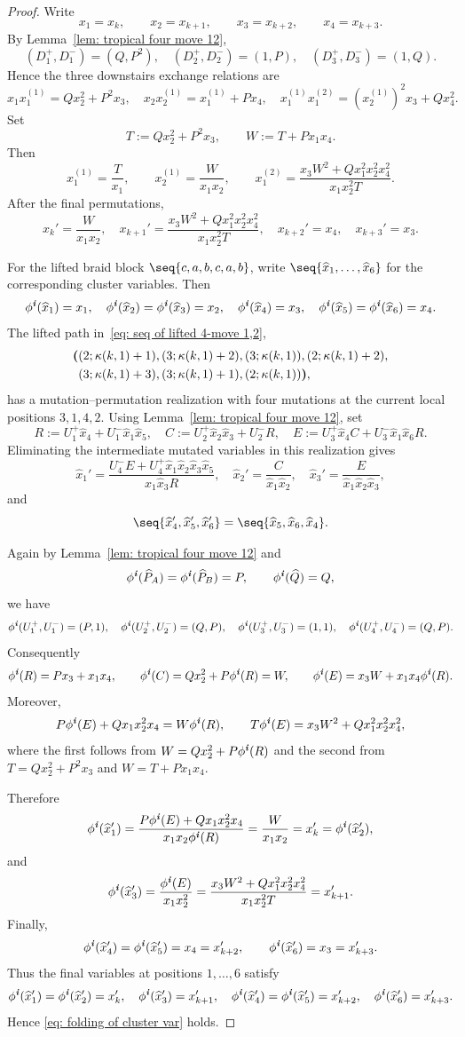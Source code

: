 \documentclass[12pt, leqno]{amsart}
\numberwithin{equation}{section}
\theoremstyle{plain}
\theoremstyle{definition}
\newcommand{\seteq}{\mathbin{:=}}
\newcommand{\ii}{ \textbf{\textit{i}}}
\newcommand{\hP}{\widehat{P}}
\newcommand{\hQ}{\widehat{Q}}
\newcommand{\hx}{\widehat{x}}
\begin{document}
\begin{proof}
Write
\[
x_1=x_k,\qquad x_2=x_{k+1},\qquad
x_3=x_{k+2},\qquad x_4=x_{k+3}.
\]
By Lemma~\ref{lem: tropical four move 12},
\[
(D_1^+,D_1^-)=(Q,P^2),\quad
(D_2^+,D_2^-)=(1,P),\quad
(D_3^+,D_3^-)=(1,Q).
\]
Hence the three downstairs exchange relations are
\[
x_1x_1^{(1)}=Qx_2^2+P^2x_3,\quad
x_2x_2^{(1)}=x_1^{(1)}+Px_4,\quad
x_1^{(1)}x_1^{(2)}=(x_2^{(1)})^2x_3+Qx_4^2.
\]
Set
\[
T \seteq Qx_2^2+P^2x_3,\qquad
W \seteq T+Px_1x_4.
\]
Then
\[
x_1^{(1)}=\frac{T}{x_1},\qquad
x_2^{(1)}=\frac{W}{x_1x_2},\qquad
x_1^{(2)}
=\frac{x_3W^2+Qx_1^2x_2^2x_4^2}{x_1x_2^2T}.
\]
After the final permutations,
\[
x_k'=\frac{W}{x_1x_2},\quad
x_{k+1}'=\frac{x_3W^2+Qx_1^2x_2^2x_4^2}{x_1x_2^2T},
\quad x_{k+2}'=x_4,\quad x_{k+3}'=x_3.
\]

  For the lifted braid block $\seq{c,a,b,c,a,b}$, write 
$\seq{\hx_1,\ldots,\hx_6}$ for the corresponding cluster variables.
Then
\[
\phi^\ii(\hx_1)=x_1,\quad
\phi^\ii(\hx_2)=\phi^\ii(\hx_3)=x_2,\quad
\phi^\ii(\hx_4)=x_3,\quad
\phi^\ii(\hx_5)=\phi^\ii(\hx_6)=x_4.
\]
The lifted path in~\eqref{eq: seq of lifted 4-move 1,2},
\begin{align*}
\boldsymbol{(}&(2;\kappa(k,1)+1),(3;\kappa(k,1)+2),
(3;\kappa(k,1)),(2;\kappa(k,1)+2), \allowdisplaybreaks \\
&(3;\kappa(k,1)+3),(3;\kappa(k,1)+1),
(2;\kappa(k,1))\boldsymbol{)},
\end{align*}
 has a mutation--permutation realization with four mutations at the current local positions $3,1,4,2$.
Using Lemma~\ref{lem: tropical four move 12}, set
\[
R \seteq U_1^+\hx_4+U_1^-\hx_1\hx_5,\quad
C \seteq U_2^+\hx_2\hx_3+U_2^-R,\quad
E \seteq U_3^+\hx_4C+U_3^-\hx_1\hx_6R.
\]
Eliminating the intermediate mutated variables  in this realization gives
\[
\hx_1'=\frac{U_4^-E+U_4^+\hx_1\hx_2\hx_3\hx_5}
{\hx_1\hx_3R},\quad
\hx_2'=\frac{C}{\hx_1\hx_2},\quad
\hx_3'=\frac{E}{\hx_1\hx_2\hx_3},
\]
and
\[
\seq{\hx_4',\hx_5',\hx_6'}=\seq{\hx_5,\hx_6,\hx_4}.
\]

Again by Lemma~\ref{lem: tropical four move 12} and
\[
\phi^\ii(\hP_A)=\phi^\ii(\hP_B)=P,
\qquad
\phi^\ii(\hQ)=Q,
\]
we have
\[
\phi^\ii(U_1^+,U_1^-)=(P,1),\quad
\phi^\ii(U_2^+,U_2^-)=(Q,P),\quad
\phi^\ii(U_3^+,U_3^-)=(1,1),\quad
\phi^\ii(U_4^+,U_4^-)=(Q,P).
\]
Consequently
\[
\phi^\ii(R)=Px_3+x_1x_4,\qquad
\phi^\ii(C)=Qx_2^2+P\phi^\ii(R)=W,\qquad
\phi^\ii(E)=x_3W+x_1x_4\phi^\ii(R).
\]
Moreover,
\[
P\phi^\ii(E)+Qx_1x_2^2x_4=W\phi^\ii(R),\qquad
T\phi^\ii(E)=x_3W^2+Qx_1^2x_2^2x_4^2,
\]
where the first follows from
$W=Qx_2^2+P\phi^\ii(R)$ and the second from
$T=Qx_2^2+P^2x_3$ and $W=T+Px_1x_4$.

Therefore
\[
\phi^\ii(\hx_1') =\frac{P\phi^\ii(E)+Qx_1x_2^2x_4}{x_1x_2\phi^\ii(R)} =\frac{W}{x_1x_2}
=x_k' =\phi^\ii(\hx_2'),
\]
and
\[
\phi^\ii(\hx_3')
=\frac{\phi^\ii(E)}{x_1x_2^2}
=\frac{x_3W^2+Qx_1^2x_2^2x_4^2}{x_1x_2^2T}
=x_{k+1}'.
\]
Finally,
\[
\phi^\ii(\hx_4')=\phi^\ii(\hx_5')=x_4=x_{k+2}',
\qquad
\phi^\ii(\hx_6')=x_3=x_{k+3}'.
\]
Thus  the final variables at positions $1,\ldots,6$ satisfy
\[
\phi^\ii(\hx_1')=\phi^\ii(\hx_2')=x_k',\quad
\phi^\ii(\hx_3')=x_{k+1}',\quad
\phi^\ii(\hx_4')=\phi^\ii(\hx_5')=x_{k+2}',\quad
\phi^\ii(\hx_6')=x_{k+3}'.
\]
Hence \eqref{eq: folding of cluster var} holds.
\end{proof}
\end{document}
